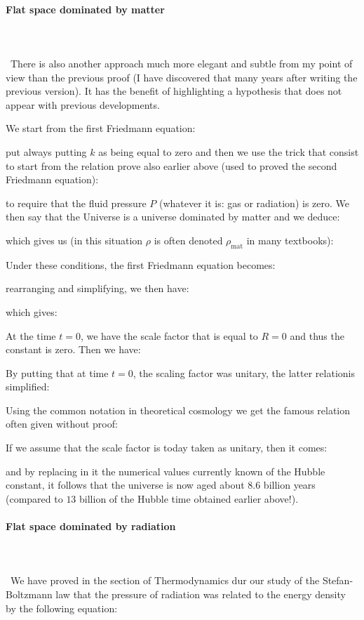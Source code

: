 	\paragraph{Flat space dominated by matter}\mbox{}\\\\\
	There is also another approach much more elegant and subtle from my point of view than the previous proof (I have discovered that many years after writing the previous version). It has the benefit of highlighting a hypothesis that does not appear with previous developments.

	We start from the first Friedmann equation:
	
	put always putting $k$ as being equal to zero and then we use the trick that consist to start from the relation prove also earlier above (used to proved the second Friedmann equation):
	
	to require that the fluid pressure $P$ (whatever it is: gas or radiation) is zero. We then say that the Universe is a universe dominated by matter and we deduce:
	
	which gives us (in this situation $\rho$ is often denoted $\rho_{\text{mat}}$ in many textbooks):
	
	Under these conditions, the first Friedmann equation becomes:
	
	rearranging and simplifying, we then have:
	
	which gives:
	
	At the time $t=0$, we have the scale factor that is equal to $R=0$ and thus the constant is zero. Then we have:
	
	By putting that at time $t=0$, the scaling factor was unitary, the latter relationis simplified:
	
	Using the common notation in theoretical cosmology we get the famous relation often given without proof:
	
	If we assume that the scale factor is today taken as unitary, then it comes:
	
	and by replacing in it the numerical values currently known of the Hubble constant, it follows that the universe is now aged about $8.6$ billion years (compared to $13$ billion of the Hubble time obtained earlier above!).
	
	\paragraph{Flat space dominated by radiation}\mbox{}\\\\\
	We have proved in the section of Thermodynamics dur our study of the Stefan-Boltzmann law that the pressure of radiation was related to the energy density by the following equation:
	
